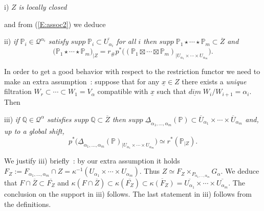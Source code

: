 \documentclass[a4paper,10pt]{amsart}
\def\a{\alpha}
\def\ux{\underline{x}}
\numberwithin{equation}{section}
\begin{document}
\vspace{.05in}

\hspace{.1in} i) \textit{$Z$ is locally closed}

\vspace{.05in}

\noindent and from (\ref{E:assoc2}) we deduce

\vspace{.05in}

\hspace{.1in} ii) \textit{if $\mathbb{P}_i \in \mathcal{Q}^{\a_i}$ satisfy $supp\;\mathbb{P}_i \subset \overline{U_{\a_i}}$ for all $i$ then $supp\;\mathbb{P}_1 \star \cdots \star \mathbb{P}_m \subset \overline{Z}$ and}
$$\big(\mathbb{P}_1 \star \cdots \star \mathbb{P}_m\big)_{|Z} = r_{\#}p^*\big( (\mathbb{P}_1 \boxtimes \cdots \boxtimes \mathbb{P}_m)_{|U_{\a_1} \times \cdots \times U_{\a_m}}\big).$$

\vspace{.1in}

In order to get a good behavior with respect to the restriction functor we need to make an extra assumption~: suppose that for any $\ux \in Z$ there exists a \textit{unique} filtration $W_r \subset \cdots \subset W_1=V_{\a}$ compatible with $\ux$ such that $\underline{dim}\;W_i/W_{i+1}=\a_i$. Then

\vspace{.05in}

\hspace{.1in} iii) \textit{if $\mathbb{Q} \in \mathcal{Q}^{\a}$ satisfies $supp\;\mathbb{Q} \subset \overline{Z}$ then
$supp\; \underline{\Delta}_{\a_1, \ldots, \a_m}(\mathbb{P}) \subset \overline{U}_{\a_1} \times \cdots \times \overline{U}_{\a_m}$ and, up to a global shift,
$$p^*\big( \underline{\Delta}_{\a_1, \ldots, \a_m}(\mathbb{P})_{|U_{\a_1} \times \cdots \times U_{\a_m}} \big) \simeq r^*(\mathbb{P}_{|Z}).$$}

\vspace{-.1in}

We justify iii) briefly~: by our extra assumption it holds $F_Z := F_{\a_1, \ldots, \a_m} \cap Z =\kappa^{-1}(U_{\a_1} \times \cdots \times U_{\a_m})$. Thus $Z \simeq   F_Z \times_{P_{\a_1, \ldots,\a_m}} G_{\a} $. We deduce that $F \cap \overline{Z} \subset \overline{F_Z}$ and $\kappa(F \cap \overline{Z}) \subset \kappa(\overline{F_Z}) \subset \overline{\kappa(F_Z)}=\overline{U_{\a_1}} \times \cdots \times \overline{U_{\a_m}}$. The conclusion on the support in iii) follows. The last statement in iii) follows from the definitions.
\end{document}
